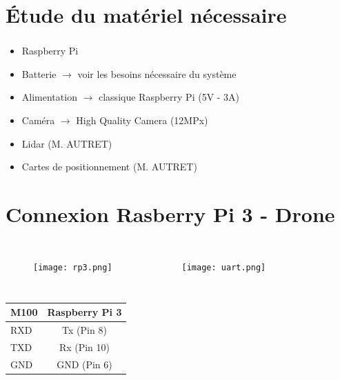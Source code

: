 \documentclass[12pt]{beamer}
\begin{document}
	\section{Étude du matériel nécessaire}	
	\begin{frame}
	\frametitle{}
	    \begin{block}{}
			\begin{itemize}
    	    [square]
				\item Raspberry Pi
				\item Batterie $\rightarrow$ voir les besoins nécessaire du système
				\item Alimentation $\rightarrow$ classique Raspberry Pi (5V - 3A)
				\item Caméra $\rightarrow$ High Quality Camera (12MPx)
				\item Lidar (M. AUTRET)
				\item Cartes de positionnement (M. AUTRET)
			\end{itemize}
		\end{block}
	\end{frame}	
	\section{Connexion Rasberry Pi 3 - Drone}	
	\begin{frame}[allowframebreaks]
    	    \begin{columns}
                    \begin{figure}
                        \texttt{[image: rp3.png]}
                    \end{figure}
                    \begin{figure}
                        \texttt{[image: uart.png]}
                     \end{figure}
            \end{columns}
            
            \begin{table}
                \begin{tabular}{| l | c |}
                \hline
                M100 & Raspberry Pi 3 \\
                \hline
                RXD & Tx (Pin 8) \\ 
                TXD & Rx (Pin 10) \\
                GND & GND (Pin 6) \\
                 \hline
                \end{tabular}
            \end{table}
	\end{frame}
\end{document}
